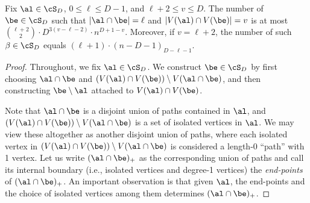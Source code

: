 \documentclass[11pt]{article}
\begin{document}
\begin{lemma}\label{lem:combinatorics:saw}
Fix $\al\in \cS_D$, $0\leq \ell \leq D-1$, and $\ell+2\leq v\leq D$. The number of $\be\in \cS_D$ such that $|\al\cap\be|=\ell$ and $|V(\al)\cap V(\be)|=v$ is at most $\binom{\ell+2}{2}\cdot D^{3(v-\ell-2)}\cdot n^{D+1-v}$. Moreover, if $v=\ell+2$, the number of such $\beta\in \cS_D$ equals $(\ell+1)\cdot(n-D-1)_{D-\ell-1}$.
\end{lemma}

\begin{proof}
Throughout, we fix $\al\in \cS_D$. We construct $\be\in \cS_D$ by first choosing $\al\cap \be$ and $(V(\al)\cap V(\be))\setminus V(\al\cap\be)$, and then constructing $\be\setminus \al$ attached to $V(\al)\cap V(\be)$.

Note that $\al \cap \be$ is a disjoint union of paths contained in $\al$, and $(V(\al)\cap V(\be))\setminus V(\al\cap \be)$ is a set of isolated vertices in $\al$. We may view these altogether as another disjoint union of paths, where each isolated vertex in $(V(\al)\cap V(\be))\setminus V(\al\cap \be)$ is considered a length-0 ``path'' with 1 vertex. Let us write $(\al\cap\be)_+$ as the corresponding union of paths and call its internal boundary (i.e., isolated vertices and degree-1 vertices) the \textit{end-points} of $(\al\cap\be)_+$. An important observation is that given $\al$, the end-points and the choice of isolated vertices among them determines $(\al\cap\be)_{+}$.


\end{proof}
\end{document}
